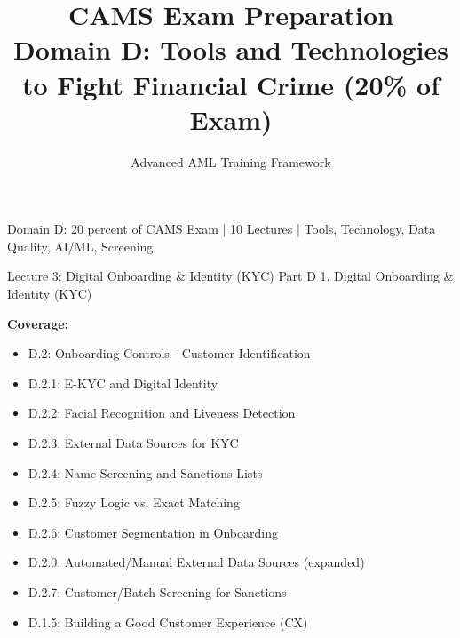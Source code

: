 \documentclass[11pt,a4paper]{beamer}
\title[CAMS Domain D]{CAMS Exam Preparation\\Domain D: Tools and Technologies\\to Fight Financial Crime (20\% of Exam)}
\author{Advanced AML Training Framework}
\date{}
\renewcommand{\tiny}{\fontsize{5pt}{6pt}\selectfont}
\begin{document}
\begin{frame}
	\titlepage
	\centering
	\tiny Domain D: 20 percent of CAMS Exam | 10 Lectures | Tools, Technology, Data Quality, AI/ML, Screening
\end{frame}


\begin{frame}{Lecture 3: Digital Onboarding \& Identity (KYC)}
	\centering
	\Large Part D 1. Digital Onboarding \& Identity (KYC)
	\vspace{0.5cm}
	
	\textbf{Coverage:}
	\begin{itemize}
		\item D.2: Onboarding Controls - Customer Identification
		\item D.2.1: E-KYC and Digital Identity
		\item D.2.2: Facial Recognition and Liveness Detection
		\item D.2.3: External Data Sources for KYC
		\item D.2.4: Name Screening and Sanctions Lists
		\item D.2.5: Fuzzy Logic vs. Exact Matching
		\item D.2.6: Customer Segmentation in Onboarding
		\item D.2.0: Automated/Manual External Data Sources (expanded)
		\item D.2.7: Customer/Batch Screening for Sanctions
		\item D.1.5: Building a Good Customer Experience (CX)
	\end{itemize}
\end{frame}
\end{document}
